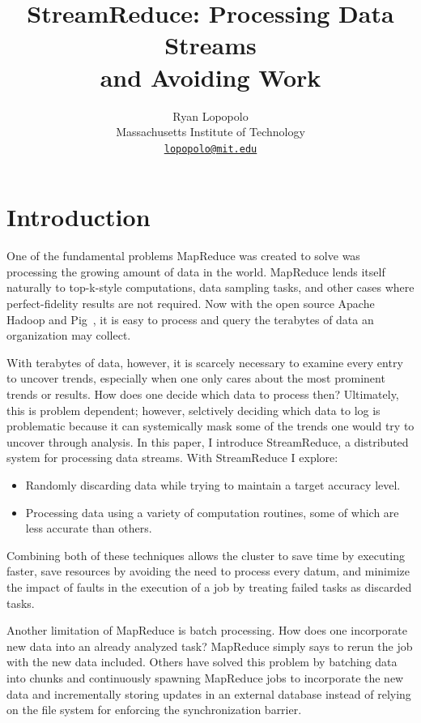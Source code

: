 \documentclass[12pt,twocolumn]{article}
\title{StreamReduce: Processing Data Streams\\and Avoiding Work}
\author{Ryan Lopopolo\\
Massachusetts Institute of Technology\\
\href{mailto:lopopolo@mit.edu}{\texttt{lopopolo@mit.edu}}}
\begin{document}
\maketitle

\section{Introduction}
\label{sec:intro}
One of the fundamental problems MapReduce was created to solve was processing
the growing amount of data in the world.
MapReduce lends itself naturally to top-k-style computations,
data sampling tasks, and other cases where perfect-fidelity results are not required.
Now with the open source Apache Hadoop
and Pig~\cite{Olston:2008:PLN:1376616.1376726}, it is easy to process and query
the terabytes of data an organization may collect.

With terabytes of data, however, it is scarcely necessary to examine
every entry to uncover trends, especially when one only cares about the most prominent
trends or results.
How does one decide which data to process then? Ultimately, this is problem dependent;
however, selctively deciding which data to
log is problematic because it can systemically mask some of the trends one would
try to uncover through analysis. In this paper, I introduce StreamReduce, a distributed system
for processing data streams. With StreamReduce I explore:
\begin{itemize}
  \item
    Randomly discarding data while trying to maintain a target accuracy level.
  \item
    Processing data using a variety of computation routines, some of which are less
    accurate than others.
\end{itemize}
Combining both of these techniques allows the cluster to save time by executing faster,
save resources by avoiding the need to process every datum, and minimize the impact of faults
in the execution of a job by treating failed tasks as discarded tasks.

Another limitation of MapReduce is batch processing. How does one
incorporate new data into an already analyzed task? MapReduce simply says to rerun
the job with the new data included. Others have solved this problem by batching data
into chunks and continuously spawning MapReduce jobs to incorporate the new data
and incrementally storing updates in an external database instead of relying on
the file system for enforcing the synchronization barrier.
\end{document}
